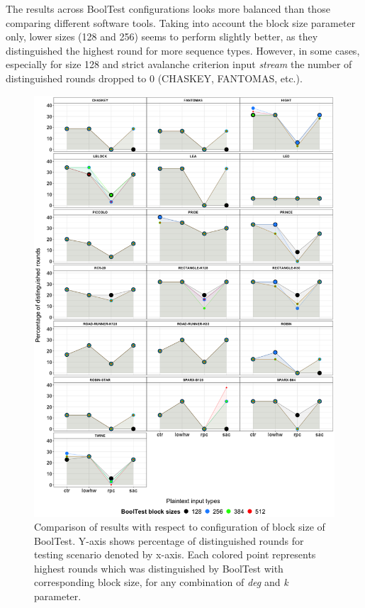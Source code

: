 \documentclass[
    digital,    %
    oneside,    %
    color,
    11pt,
    nocover,
    notable,
    nolof,
    nolot,
    final
]{fithesis3}
\renewcommand\_{\textunderscore\allowbreak}
\begin{document}
The results across BoolTest configurations looks more balanced than those comparing different software tools. Taking into account the block size parameter only, lower sizes (128 and 256) seems to perform slightly better, as they distinguished the highest round for more sequence types. However, in some cases, especially for size 128 and strict avalanche criterion input \textit{stream} the number of distinguished rounds dropped to 0 (CHASKEY, FANTOMAS, etc.).

\begin{figure}[htp]
	\centering
	\includegraphics[width=\textwidth]{./images/pictures/bool_test_block_size_comparison.png}
	\caption{Comparison of results with respect to configuration of block size of BoolTest. Y-axis shows percentage of distinguished rounds for testing scenario denoted by x-axis. Each colored point represents highest rounds which was distinguished by BoolTest with corresponding block size, for any combination of \textit{deg} and \textit{k} parameter.}
	\label{fig:bool_test_block}
\end{figure}
\end{document}
